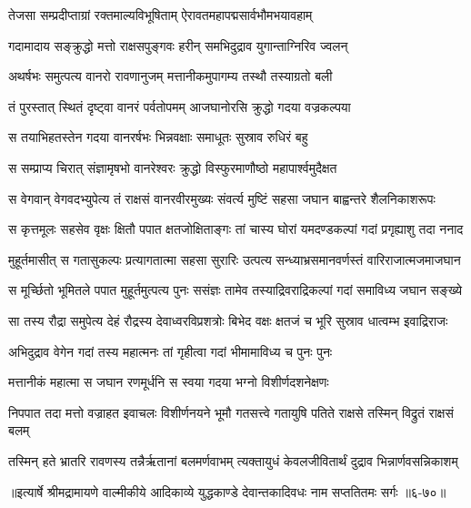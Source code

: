 \twolineshloka
{तेजसा सम्प्रदीप्ताग्रां रक्तमाल्यविभूषिताम्}
{ऐरावतमहापद्मसार्वभौमभयावहाम्} %

\twolineshloka
{गदामादाय सङ्क्रुद्धो मत्तो राक्षसपुङ्गवः}
{हरीन् समभिदुद्राव युगान्ताग्निरिव ज्वलन्} %

\twolineshloka
{अथर्षभः समुत्पत्य वानरो रावणानुजम्}
{मत्तानीकमुपागम्य तस्थौ तस्याग्रतो बली} %

\twolineshloka
{तं पुरस्तात् स्थितं दृष्ट्वा वानरं पर्वतोपमम्}
{आजघानोरसि क्रुद्धो गदया वज्रकल्पया} %

\twolineshloka
{स तयाभिहतस्तेन गदया वानरर्षभः}
{भिन्नवक्षाः समाधूतः सुस्राव रुधिरं बहु} %

\twolineshloka
{स सम्प्राप्य चिरात् संज्ञामृषभो वानरेश्वरः}
{क्रुद्धो विस्फुरमाणौष्ठो महापार्श्वमुदैक्षत} %

\twolineshloka
{स वेगवान् वेगवदभ्युपेत्य तं राक्षसं वानरवीरमुख्यः}
{संवर्त्य मुष्टिं सहसा जघान बाह्वन्तरे शैलनिकाशरूपः} %

\twolineshloka
{स कृत्तमूलः सहसेव वृक्षः क्षितौ पपात क्षतजोक्षिताङ्गः}
{तां चास्य घोरां यमदण्डकल्पां गदां प्रगृह्याशु तदा ननाद} %

\twolineshloka
{मुहूर्तमासीत् स गतासुकल्पः प्रत्यागतात्मा सहसा सुरारिः}
{उत्पत्य सन्ध्याभ्रसमानवर्णस्तं वारिराजात्मजमाजघान} %

\twolineshloka
{स मूर्च्छितो भूमितले पपात मुहूर्तमुत्पत्य पुनः ससंज्ञः}
{तामेव तस्याद्रिवराद्रिकल्पां गदां समाविध्य जघान सङ्ख्ये} %

\twolineshloka
{सा तस्य रौद्रा समुपेत्य देहं रौद्रस्य देवाध्वरविप्रशत्रोः}
{बिभेद वक्षः क्षतजं च भूरि सुस्राव धात्वम्भ इवाद्रिराजः} %

\twolineshloka
{अभिदुद्राव वेगेन गदां तस्य महात्मनः}
{तां गृहीत्वा गदां भीमामाविध्य च पुनः पुनः} %

\twolineshloka
{मत्तानीकं महात्मा स जघान रणमूर्धनि}
{स स्वया गदया भग्नो विशीर्णदशनेक्षणः} %

\threelineshloka
{निपपात तदा मत्तो वज्राहत इवाचलः}
{विशीर्णनयने भूमौ गतसत्त्वे गतायुषि}
{पतिते राक्षसे तस्मिन् विद्रुतं राक्षसं बलम्} %

\twolineshloka
{तस्मिन् हते भ्रातरि रावणस्य तन्नैर्ऋतानां बलमर्णवाभम्}
{त्यक्तायुधं केवलजीवितार्थं दुद्राव भिन्नार्णवसन्निकाशम्} %


॥इत्यार्षे श्रीमद्रामायणे वाल्मीकीये आदिकाव्ये युद्धकाण्डे देवान्तकादिवधः नाम सप्ततितमः सर्गः ॥६-७०॥
